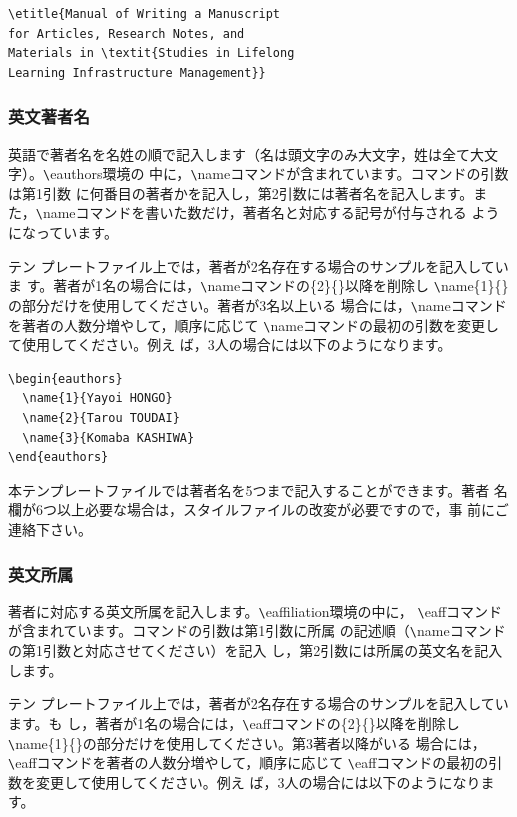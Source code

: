 \documentclass[b5paper,10pt,twocolumn,tombow]{jarticle}
\begin{document}
\begin{verbatim}
\etitle{Manual of Writing a Manuscript
for Articles, Research Notes, and
Materials in \textit{Studies in Lifelong
Learning Infrastructure Management}}
\end{verbatim}

\subsubsection{英文著者名}
英語で著者名を名姓の順で記入します（名は頭文字のみ大文字，姓は全て大文字）。\verb|\|eauthors環境の
中に，\verb|\|nameコマンドが含まれています。コマンドの引数は第1引数
に何番目の著者かを記入し，第2引数には著者名を記入します。ま
た，\verb|\|nameコマンドを書いた数だけ，著者名と対応する記号が付与される
ようになっています。


テン
プレートファイル上では，著者が2名存在する場合のサンプルを記入していま
す。著者が1名の場合には，\verb|\|nameコマンドの\{2\}\{\}以降を削除し
\verb|\|name\{1\}\{\}の部分だけを使用してください。著者が3名以上いる
場合には，\verb|\|nameコマンドを著者の人数分増やして，順序に応じて
\verb|\|nameコマンドの最初の引数を変更して使用してください。例え
ば，3人の場合には以下のようになります。
\begin{verbatim}
\begin{eauthors}
  \name{1}{Yayoi HONGO}
  \name{2}{Tarou TOUDAI}
  \name{3}{Komaba KASHIWA}
\end{eauthors}
\end{verbatim}
本テンプレートファイルでは著者名を5つまで記入することができます。著者
名欄が6つ以上必要な場合は，スタイルファイルの改変が必要ですので，事
前にご連絡下さい。


\subsubsection{英文所属}
著者に対応する英文所属を記入します。\verb|\|eaffiliation環境の中に，
\verb|\|eaffコマンドが含まれています。コマンドの引数は第1引数に所属
の記述順（\verb|\|nameコマンドの第1引数と対応させてください）を記入
し，第2引数には所属の英文名を記入します。


テン
プレートファイル上では，著者が2名存在する場合のサンプルを記入しています。も
し，著者が1名の場合には，\verb|\|eaffコマンドの\{2\}\{\}以降を削除し
\verb|\|name\{1\}\{\}の部分だけを使用してください。第3著者以降がいる
場合には，\verb|\|eaffコマンドを著者の人数分増やして，順序に応じて
\verb|\|eaffコマンドの最初の引数を変更して使用してください。例え
ば，3人の場合には以下のようになります。
\end{document}
